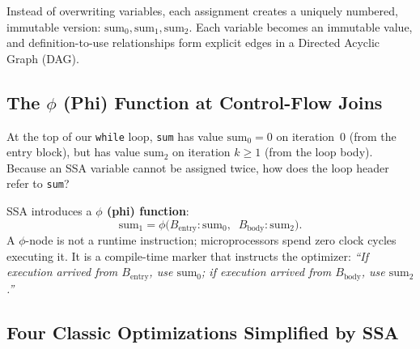 Instead of overwriting variables, each assignment creates a uniquely numbered,
immutable version: $\text{sum}_0, \text{sum}_1, \text{sum}_2$. Each variable
becomes an immutable value, and definition-to-use relationships form explicit
edges in a Directed Acyclic Graph (DAG).

\subsection{The \texorpdfstring{$\phi$}{Phi} (Phi) Function at Control-Flow Joins}

At the top of our \texttt{while} loop, \texttt{sum} has value $\text{sum}_0 = 0$
on iteration~0 (from the entry block), but has value $\text{sum}_2$ on iteration
$k \ge 1$ (from the loop body). Because an SSA variable cannot be assigned twice,
how does the loop header refer to \texttt{sum}?

SSA introduces a \textbf{$\phi$ (phi) function}:
\[
  \text{sum}_1 = \phi\bigl(B_{\text{entry}} : \text{sum}_0,\;\; B_{\text{body}} : \text{sum}_2\bigr).
\]
A $\phi$-node is not a runtime instruction; microprocessors spend zero clock
cycles executing it. It is a compile-time marker that instructs the optimizer:
\emph{``If execution arrived from $B_{\text{entry}}$, use $\text{sum}_0$; if
execution arrived from $B_{\text{body}}$, use $\text{sum}_2$.''}

\subsection{Four Classic Optimizations Simplified by SSA}

